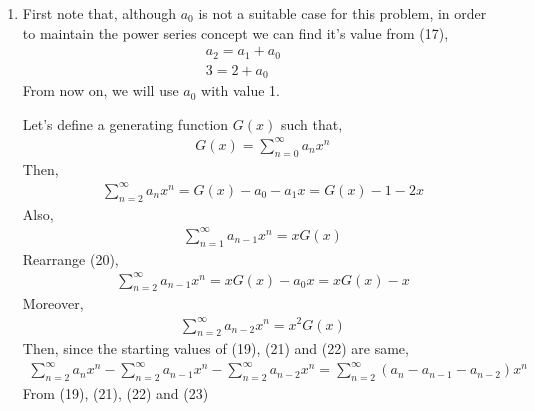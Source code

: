 \documentclass[12pt]{article}
\begin{document}
\begin{enumerate}
\item First note that, although $a_{0}$ is not a suitable case for this problem, in order to maintain the power series concept we can find it's value from (17),
\begin{equation*}
\begin{split}
a_{2} = a_{1} + a_{0} \qquad & \\ 
3 = 2 + a_{0} \qquad
\end{split}
\end{equation*}
From now on, we will use $a_{0}$ with value 1.

Let's define a generating function $G(x)$ such that,
\begin{equation}
\begin{split}
G(x) = \sum_{n=0}^{\infty} a_{n}x^{n} 
\end{split}
\end{equation}
Then,
\begin{equation}
\begin{split}
\sum_{n=2}^{\infty} a_{n}x^{n} = G(x)-a_{0}-a_{1}x = G(x) -1 -2x 
\end{split}
\end{equation}
Also,
\begin{equation}
\begin{split}
\sum_{n=1}^{\infty} a_{n-1}x^{n} = xG(x) 
\end{split}
\end{equation}
Rearrange (20),
\begin{equation}
\begin{split}
\sum_{n=2}^{\infty} a_{n-1}x^{n} = xG(x)-a_{0}x = xG(x)-x 
\end{split}
\end{equation}
Moreover,
\begin{equation}
\begin{split}
\sum_{n=2}^{\infty} a_{n-2}x^{n} = x^2G(x) 
\end{split}
\end{equation}
Then, since the starting values of (19), (21) and (22) are same,
\begin{equation}
\begin{split}
\sum_{n=2}^{\infty} a_{n}x^{n}-\sum_{n=2}^{\infty} a_{n-1}x^{n}-\sum_{n=2}^{\infty} a_{n-2}x^{n} = \sum_{n=2}^{\infty} (a_{n}-a_{n-1}-a_{n-2})x^{n}
\end{split}
\end{equation}
From (19), (21), (22) and (23)
\begin{equation}
\begin{split}

\end{split}
\end{equation}
\end{enumerate}
\end{document}
